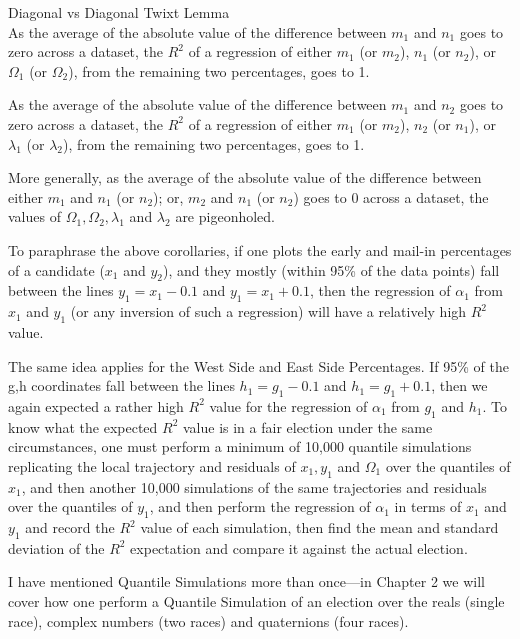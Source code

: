 \begin{corollary}{Diagonal vs Diagonal Twixt Lemma}\\
As the average of the absolute value of the difference between $m_{1}$ and $n_{1}$ goes to zero across a dataset, the $R^2$ of a regression of either $m_{1}$ (or $m_{2}$), $n_{1}$ (or $n_{2}$), or $\Omega_{1}$ (or $\Omega_{2}$), from the remaining two percentages, goes to 1.

As the average of the absolute value of the difference between $m_{1}$ and $n_{2}$ goes to zero across a dataset, the $R^2$ of a regression of either $m_{1}$ (or $m_{2}$), $n_{2}$ (or $n_{1}$), or $\lambda_{1}$ (or $\lambda_{2}$), from the remaining two percentages, goes to 1.

More generally, as the average of the absolute value of the difference between either $m_{1}$ and $n_{1}$ (or $n_{2}$); or, $m_{2}$ and $n_{1}$ (or $n_{2}$) goes to 0 across a dataset, the values of $\Omega_{1},\Omega_{2}, \lambda_{1}$ and $\lambda_{2}$ are pigeonholed.
\end{corollary}

To paraphrase the above corollaries, if one plots the early and mail-in percentages of a candidate ($x_{1}$ and $y_{2}$), and they mostly (within 95\% of the data points) fall between the lines $y_{1}=x_{1}-0.1$ and $y_{1}=x_{1}+0.1$, then the regression of $\alpha_{1}$ from $x_{1}$ and $y_{1}$ (or any inversion of such a regression) will have a relatively high $R^2$ value.

The same idea applies for the West Side and East Side Percentages. If 95\% of the g,h coordinates fall between the lines $h_{1}=g_{1}-0.1$ and $h_{1}=g_{1}+0.1$, then we again expected a rather high $R^2$ value for the regression of $\alpha_{1}$ from $g_{1}$ and $h_{1}$.
\newpage
To know what the expected $R^2$ value is in a fair election under the same circumstances, one must perform a minimum of 10,000 quantile simulations replicating the local trajectory and residuals of $x_{1}, y_{1}$ and $\Omega_{1}$ over the quantiles of $x_{1}$, and then another 10,000 simulations of the same trajectories and residuals over the quantiles of $y_{1}$, and then perform the regression of $\alpha_{1}$ in terms of $x_{1}$ and $y_{1}$ and record the $R^2$ value of each simulation, then find the mean and standard deviation of the $R^2$ expectation and compare it against the actual election.

I have mentioned Quantile Simulations more than once---in Chapter 2 we will cover how one perform a Quantile Simulation of an election over the reals (single race), complex numbers (two races) and quaternions (four races).

